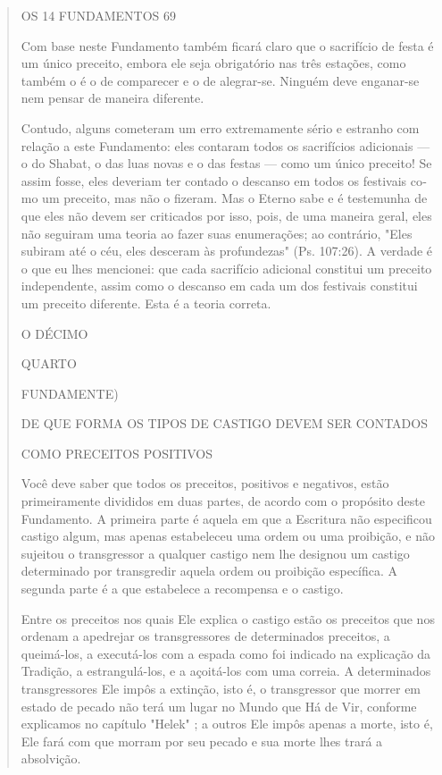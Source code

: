 \begin{quote}
OS 14 FUNDAMENTOS 69

Com base neste Fundamento também ficará claro que o sacrifício de festa
é um único preceito, embora ele seja obrigatório nas três estações,
co­mo também o é o de comparecer e o de alegrar-se. Ninguém deve
enganar-se nem pensar de maneira diferente.

Contudo, alguns cometeram um erro extremamente sério e estranho com
relação a este Fundamento: eles contaram todos os sacrifícios adicionais
--- o do Shabat, o das luas novas e o das festas --- como um único
preceito! Se assim fosse, eles deveriam ter contado o descanso em todos
os festivais co­mo um preceito, mas não o fizeram. Mas o Eterno sabe e é
testemunha de que eles não devem ser criticados por isso, pois, de uma
maneira geral, eles não seguiram uma teoria ao fazer suas enumerações;
ao contrário, "Eles subiram até o céu, eles desceram às profundezas"
(Ps. 107:26). A verdade é o que eu lhes mencionei: que cada sacrifício
adicional constitui um preceito indepen­dente, assim como o descanso em
cada um dos festivais constitui um preceito diferente. Esta é a teoria
correta.

O DÉCIMO

QUARTO

FUNDAMENTE)

DE QUE FORMA OS TIPOS DE CASTIGO DEVEM SER CONTADOS

COMO PRECEITOS POSITIVOS

Você deve saber que todos os preceitos, positivos e negativos, estão
primeiramente divididos em duas partes, de acordo com o propósito deste
Fun­damento. A primeira parte é aquela em que a Escritura não
especificou castigo algum, mas apenas estabeleceu uma ordem ou uma
proibição, e não sujeitou o transgressor a qualquer castigo nem lhe
designou um castigo determinado por transgredir aquela ordem ou
proibição específica. A segunda parte é a que estabelece a recompensa e
o castigo.

Entre os preceitos nos quais Ele explica o castigo estão os preceitos
que nos ordenam a apedrejar os transgressores de determinados preceitos,
a queimá-los, a executá-los com a espada como foi indicado na explicação
da Tra­dição, a estrangulá-los, e a açoitá-los com uma correia. A
determinados trans­gressores Ele impôs a extinção, isto é, o
transgressor que morrer em estado de pecado não terá um lugar no Mundo
que Há de Vir, conforme explicamos no capítulo "Helek" ; a outros Ele
impôs apenas a morte, isto é, Ele fará com que morram por seu pecado e
sua morte lhes trará a absolvição.


\end{quote}
